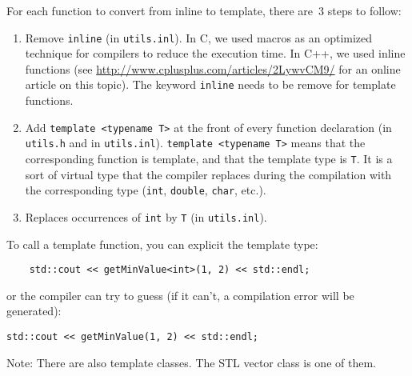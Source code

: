 For each function to convert from inline to template, there are~3 steps to follow:
\begin{enumerate}
 \item Remove \verb'inline' (in \verb+utils.inl+).
      In C, we used macros as an optimized technique for compilers to reduce the execution time. In C++, we used inline functions (see \url{http://www.cplusplus.com/articles/2LywvCM9/} for an online article on this topic). The keyword \verb'inline' needs to be remove for template functions.

 \item Add \verb'template <typename T>' at the front of every function declaration (in \verb+utils.h+ and in \verb+utils.inl+). \verb'template <typename T>' means that the corresponding function is template, and that the template type is \verb'T'. It is a sort of virtual type that the compiler replaces during the compilation with the corresponding type (\verb'int', \verb'double', \verb'char', etc.). 
 
 \item Replaces occurrences of \verb'int' by \verb'T' (in \verb'utils.inl').
\end{enumerate}
To call a template function, you can explicit the template type:
\begin{lstlisting}
    std::cout << getMinValue<int>(1, 2) << std::endl;
\end{lstlisting}
or the compiler can try to guess (if it can't, a compilation error will be generated):
\begin{lstlisting}
std::cout << getMinValue(1, 2) << std::endl;
\end{lstlisting}

Note: There are also template classes. The STL vector class is one of them.
